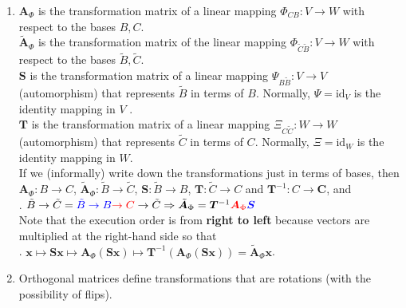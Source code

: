 \begin{enumerate}
    \item
    $\bm{A}_\Phi$  is the transformation matrix of a linear mapping $\Phi _{CB} : V \to  W$ with respect to the bases $B, C$.
    \hfill \cite{mfml/book/mml/Deisenroth-Faisal-Ong}
    \\[0.2cm]
    $\tilde{\bm{A}}_\Phi$  is the transformation matrix of the linear mapping $\Phi_ {\tilde{C}\tilde{B}} : V \to  W$ with respect to the bases $\tilde{B}, \tilde{C}$.
    \hfill \cite{mfml/book/mml/Deisenroth-Faisal-Ong}
    \\[0.2cm]
    $\bm{S}$ is the transformation matrix of a linear mapping $\Psi _{B\tilde{B}} : V \to  V$ (automorphism) that represents $\tilde{B}$ in terms of $B$. Normally, $\Psi  = \text{id}_V$ is the identity mapping in $V$ .
    \hfill \cite{mfml/book/mml/Deisenroth-Faisal-Ong}
    \\[0.2cm]
    $\bm{T}$ is the transformation matrix of a linear mapping $\Xi _{C\tilde{C}} : W \to  W$ (automorphism) that represents $\tilde{C}$ in terms of $C$. Normally, $\Xi  = \text{id}_W$ is the identity mapping in $W$.
    \hfill \cite{mfml/book/mml/Deisenroth-Faisal-Ong}
    \\[0.2cm]
    If we (informally) write down the transformations just in terms of bases, then $\bm{A}_\Phi  : B \to  C$, $\tilde{\bm{A}}_\Phi  : \tilde{B} \to  \tilde{C}$, $\bm{S} : \tilde{B} \to  B$, $\bm{T} : \tilde{C} \to  C$ and $\bm{T}^{-1} : C \to  \bm{C}$, and
    \hfill \cite{mfml/book/mml/Deisenroth-Faisal-Ong}
    \\[0.2cm]
    .\hfill
    $
        \tilde{B} \to  \tilde{C} = \textcolor{blue}{\tilde{B} \to  B} \textcolor{red}{\to  C} \to  \tilde{C}
        \Rightarrow
        \tilde{\bm{A}}_\Phi  = \bm{T}^{-1} \textcolor{red}{\bm{A}_\Phi} \textcolor{blue}{\bm{S}}
    $
    \hfill \cite{mfml/book/mml/Deisenroth-Faisal-Ong}
    \\[0.2cm]
    Note that the execution order is from \textbf{right to left} because vectors are multiplied at the right-hand side so that
    \hfill \cite{mfml/book/mml/Deisenroth-Faisal-Ong}
    \\[0.2cm]
    .\hfill
    $\bm{x} \mapsto  \bm{Sx} \mapsto  \bm{A}_\Phi (\bm{Sx}) \mapsto \bm{T}^{-1}(\bm{A}_\Phi (\bm{Sx})) = \tilde{\bm{A}}_\Phi \bm{x}$.
    \hfill \cite{mfml/book/mml/Deisenroth-Faisal-Ong}

    \item  Orthogonal matrices define transformations that are rotations (with the possibility of flips).
    \hfill \cite{mfml/book/mml/Deisenroth-Faisal-Ong}
\end{enumerate}






